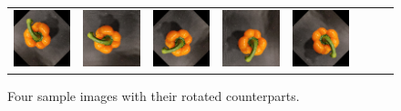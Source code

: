 \begin{figure}[tp]
\begin{center}
\begin{tabular}{c|ccccccc}
			\includegraphics[scale=0.4]{./img/pepper_3.png} &
			\includegraphics[scale=0.4]{./img/pepper_4.png} &
			\includegraphics[scale=0.4]{./img/pepper_5.png} &
			\includegraphics[scale=0.4]{./img/pepper_6.png} &
			\includegraphics[scale=0.4]{./img/pepper_7.png} \\
		\end{tabular}
		\label{tab:veg_types}
	\end{center}
	\caption{Four sample images with their rotated counterparts.}
	\label{fig:veg_rotations}
\end{figure}
\egroup